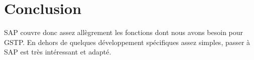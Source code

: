 \section{Conclusion}

SAP couvre donc assez allègrement les fonctions dont nous avons besoin pour GSTP.
En dehors de quelques développement spécifiques assez simples, passer à SAP 
est très intéressant et adapté.
